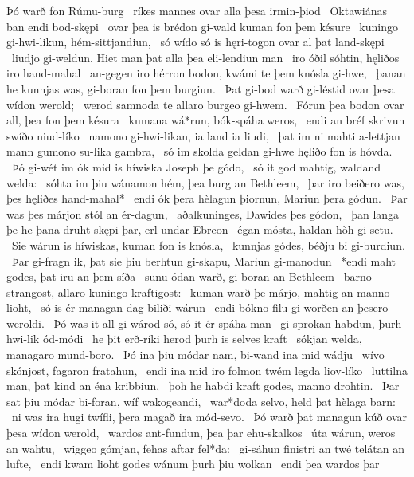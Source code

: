 Þó warð fon Rúmu-burg \hld\ ríkes mannes
ovar alla þesa irmin-þiod \hld\ Oktawiánas
ban endi bod-skępi \hld\ ovar þea is brédon gi-wald
kuman fon þem késure \hld\ kuningo gi-hwi-likun,
hém-sittjandiun, \hld\ só wído só is hęri-togon
ovar al þat land-skępi \hld\ liudjo gi-weldun.
Hiet man þat alla þea eli-lendiun man \hld\ iro óðil sóhtin,
hęliðos iro hand-mahal \hld\ an-gegen iro hérron bodon,
kwámi te þem knósla gi-hwe, \hld\ þanan he kunnjas was,
gi-boran fon þem burgiun. \hld\ Þat gi-bod warð gi-léstid
ovar þesa wídon werold; \hld\ werod samnoda
te allaro burgeo gi-hwem. \hld\ Fórun þea bodon ovar all,
þea fon þem késura \hld\ kumana wá*run,
bók-spáha weros, \hld\ endi an bréf skrivun
swíðo niud-líko \hld\ namono gi-hwi-likan,
ia land ia liudi, \hld\ þat im ni mahti a-lettjan mann
gumono su-lika gambra, \hld\ só im skolda geldan gi-hwe
hęliðo fon is hóvda. \hld\ Þó gi-wét im ók mid is híwiska
Joseph þe gódo, \hld\ só it god mahtig,
waldand welda: \hld\ sóhta im þiu wánamon hém,
þea burg an Bethleem, \hld\ þar iro beiðero was,
þes hęliðes hand-mahal* \hld\ endi ók þera hèlagun þiornun,
Mariun þera gódun. \hld\ Þar was þes márjon stól
an ér-dagun, \hld\ aðalkuninges,
Dawides þes gódon, \hld\ þan langa þe he þana druht-skępi þar,
erl undar Ebreon \hld\ égan mósta,
haldan hòh-gi-setu. \hld\ Sie wárun is híwiskas,
kuman fon is knósla, \hld\ kunnjas gódes,
béðju bi gi-burdiun. \hld\ Þar gi-fragn ik, þat sie þiu berhtun gi-skapu,
Mariun gi-manodun \hld\ *endi maht godes,
þat iru an þem síða \hld\ sunu ódan warð,
gi-boran an Bethleem \hld\ barno strangost,
allaro kuningo kraftigost: \hld\ kuman warð þe márjo,
mahtig an manno lioht, \hld\ só is ér managan dag
biliði wárun \hld\ endi bókno filu
gi-worðen an þesero weroldi. \hld\ Þó was it all gi-wárod só,
só it ér spáha man \hld\ gi-sprokan habdun,
þurh hwi-lik ód-módi \hld\ he þit erð-ríki herod
þurh is selves kraft \hld\ sókjan welda,
managaro mund-boro. \hld\ Þó ina þiu módar nam,
bi-wand ina mid wádju \hld\ wívo skónjost,
fagaron fratahun, \hld\ endi ina mid iro folmon twém
legda liov-líko \hld\ luttilna man,
þat kind an éna kribbiun, \hld\ þoh he habdi kraft godes,
manno drohtin. \hld\ Þar sat þiu módar bi-foran,
wíf wakogeandi, \hld\ war*doda selvo,
held þat hèlaga barn: \hld\ ni was ira hugi twífli,
þera magað ira mód-sevo. \hld\ Þó warð þat managun kúð
ovar þesa wídon werold, \hld\ wardos ant-fundun,
þea þar ehu-skalkos \hld\ úta wárun,
weros an wahtu, \hld\ wiggeo gómjan,
fehas aftar fel*da: \hld\ gi-sáhun finistri an twé
telátan an lufte, \hld\ endi kwam lioht godes
wánum þurh þiu wolkan \hld\ endi þea wardos þar
